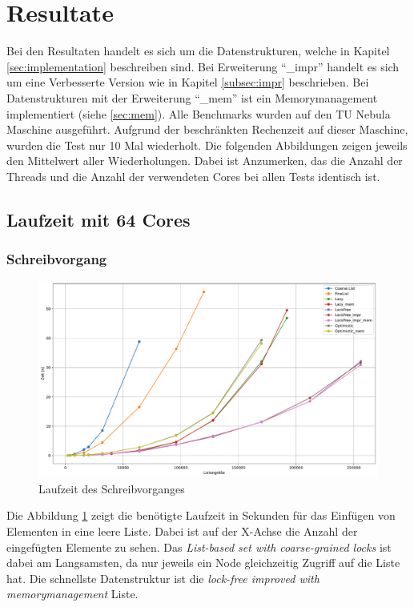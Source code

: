 \section{Resultate}
Bei den Resultaten handelt es sich um die Datenstrukturen, welche in Kapitel \ref{sec:implementation} beschreiben sind.
Bei Erweiterung ``\_impr'' handelt es sich um eine Verbesserte Version wie in Kapitel \ref{subsec:impr} beschrieben.
Bei Datenstrukturen mit der Erweiterung ``\_mem'' ist ein Memorymanagement implementiert (siehe \ref{sec:mem}).
Alle Benchmarks wurden auf den TU Nebula Maschine ausgeführt. Aufgrund der beschränkten Rechenzeit auf dieser Maschine,
wurden die Test nur 10 Mal wiederholt. Die folgenden Abbildungen zeigen jeweils den Mittelwert aller Wiederholungen.
Dabei ist Anzumerken, das die Anzahl der Threads und die Anzahl der verwendeten Cores bei allen Tests identisch ist. 

\subsection{Laufzeit mit 64 Cores}

\subsubsection{Schreibvorgang}
\begin{figure}[ht!]
	\centering
	\includegraphics[width=1.0\linewidth]{./plots_pdf/write_time} 
	\caption{Laufzeit des Schreibvorganges}
	\label{fig:write_time} 
\end{figure}
Die Abbildung \ref{fig:write_time} zeigt die benötigte Laufzeit in Sekunden für das Einfügen von Elementen in eine leere Liste.
Dabei ist auf der X-Achse die Anzahl der eingefügten Elemente zu sehen. 
Das \textit{List-based set with coarse-grained locks} ist dabei am Langsamsten, da nur jeweils ein Node gleichzeitig 
Zugriff auf die Liste hat. Die schnellste Datenstruktur ist die \textit{lock-free improved with memorymanagement} Liste.


